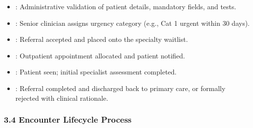 \begin{itemize}
\begin{itemize}
\item 
\texttt{}: Administrative validation of patient details, mandatory fields, and tests.



\item 
\texttt{}: Senior clinician assigns urgency category (e.g., Cat 1 urgent within 30 days).



\item 
\texttt{}: Referral accepted and placed onto the specialty waitlist.



\item 
\texttt{}: Outpatient appointment allocated and patient notified.



\item 
\texttt{}: Patient seen; initial specialist assessment completed.



\item 
\texttt{}: Referral completed and discharged back to primary care, or formally rejected with clinical rationale.



\end{itemize}


\end{itemize}
\label{rad:processes:117}

\par\smallskip
{}\label{rad:processes:119}
\subsubsection*{3.4 Encounter Lifecycle Process}
\label{rad:processes:120}

